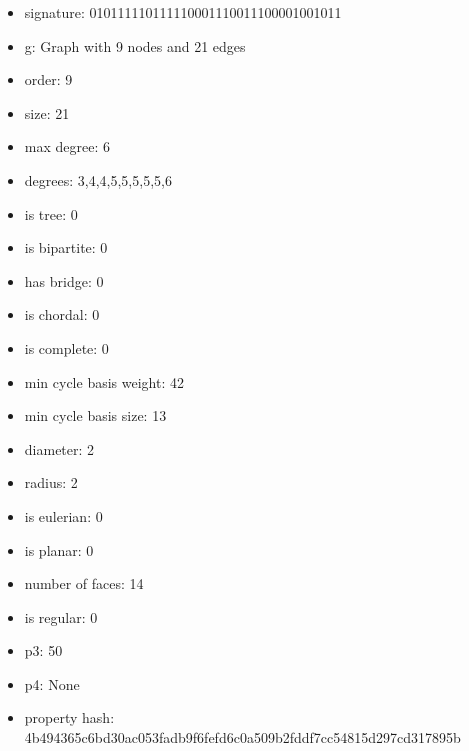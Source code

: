 \newpage
\begin{figure}
\end{figure}
\begin{itemize}
\item signature: 010111110111110001110011100001001011
\item g: Graph with 9 nodes and 21 edges
\item order: 9
\item size: 21
\item max degree: 6
\item degrees: 3,4,4,5,5,5,5,5,6
\item is tree: 0
\item is bipartite: 0
\item has bridge: 0
\item is chordal: 0
\item is complete: 0
\item min cycle basis weight: 42
\item min cycle basis size: 13
\item diameter: 2
\item radius: 2
\item is eulerian: 0
\item is planar: 0
\item number of faces: 14
\item is regular: 0
\item p3: 50
\item p4: None
\item property hash: 4b494365c6bd30ac053fadb9f6fefd6c0a509b2fddf7cc54815d297cd317895b
\end{itemize}
